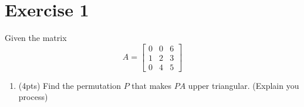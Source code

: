 \section{Exercise 1}
Given the matrix 
\begin{equation}
    A = 
    \begin{bmatrix}
        0       &       0       &       6       \\
        1       &       2       &       3       \\
        0       &       4       &       5
    \end{bmatrix}
\end{equation}

\begin{enumerate}[label=(\alph*)]
    \item (4pts) Find the permutation $P$ that makes $PA$ upper triangular.
        (Explain you process)


\end{enumerate}
